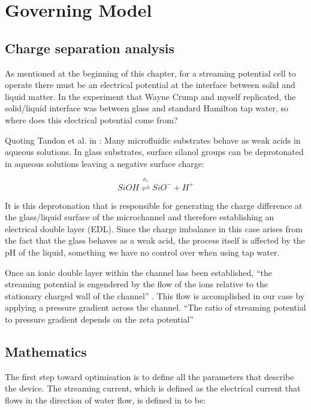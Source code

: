 \section{Governing Model}


\subsection{Charge separation analysis}

As mentioned at the beginning of this chapter, for a streaming potential cell
to operate there must be an electrical potential at the interface between solid
and liquid matter. In the experiment that Wayne Crump and myself replicated,
the solid/liquid interface was between glass and standard Hamilton tap water,
so where does this electrical potential come from?

Quoting Tandon et al. in \cite{Tandon2008}: Many microfluidic substrates behave
as weak acids in aqueous solutions. In glass substrates, surface silanol groups
can be deprotonated in aqueous solutions leaving a negative surface charge:

\begin{equation}
    SiOH\overset{^{K_{a}}}{\mathbf{\rightleftharpoons}}SiO^{-}+H^{+}
\end{equation}


It is this deprotonation that is responsible for generating the charge
difference at the glass/liquid surface of the microchannel and therefore
establishing an electrical double layer (EDL). Since the charge imbalance in
this case arises from the fact that the glass behaves as a weak acid, the
process itself is affected by the pH of the liquid, something we have no
control over when using tap water.

Once an ionic double layer within the channel has been established, ``the
streaming potential is engendered by the flow of the ions relative to the
stationary charged wall of the channel'' \cite{Mansouri2005}.  This flow is
accomplished in our case by applying a pressure gradient across the channel.
``The ratio of streaming potential to pressure gradient depends on the zeta
potential''\cite{Park2009}


\subsection{\label{sub:StreamingCell-Mathematics}Mathematics}

The first step toward optimisation is to define all the parameters that
describe the device. The streaming current, which is defined as the electrical
current that flows in the direction of water flow, is defined in
\cite{Olthuis2005} to be:

